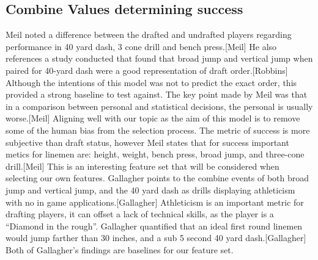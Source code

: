\documentclass[confrence]{IEEEtran}
\begin{document}
\subsection*{Combine Values determining success}
Meil noted a difference between the drafted and undrafted players regarding performance in 40 yard dash, 3 cone drill and bench press.[Meil]
He also references a study conducted that found that broad jump and vertical jump when paired for 40-yard dash were a good representation of draft order.[Robbins]
Although the intentions of this model was not to predict the exact order, this provided a strong baseline to test against.
The key point made by Meil was that in a comparison between personal and statistical decisions, the personal is usually worse.[Meil]
Aligning well with our topic as the aim of this model is to remove some of the human bias from the selection process.
The metric of success is more subjective than draft status, however Meil states that for success important metics for linemen are: height, weight, bench press, broad jump, and three-cone drill.[Meil]
This is an interesting feature set that will be considered when selecting our own features.
Gallagher points to the combine events of both broad jump and vertical jump, and the 40 yard dash as drills displaying athleticism with no in game applications.[Gallagher]
Athleticism is an important metric for drafting players, it can offset a lack of technical skills, as the player is a “Diamond in the rough”.
Gallagher quantified that an ideal first round linemen would jump farther than 30 inches, and a sub 5 second 40 yard dash.[Gallagher]
Both of Gallagher's findings are baselines for our feature set.
\end{document}

